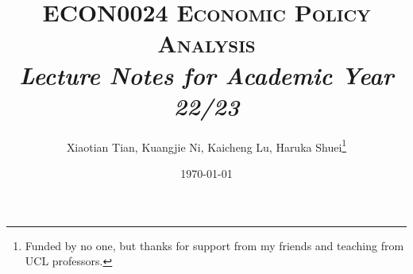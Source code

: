 \documentclass{report}
\title{\textsc{ECON0024 Economic Policy Analysis}\\
{\Large \textit{Lecture Notes for Academic Year 22/23}}}
\author{Xiaotian Tian, Kuangjie Ni, Kaicheng Lu, Haruka Shuei\thanks{Funded by no one, but thanks for support from my friends and teaching from UCL professors.}}
\date{\today}
\begin{document}
\begin{CJK*}{UTF8}{gbsn}%

\pagestyle{fancy}%

\maketitle

\newpage
    \hypertarget{tableofcontents}{\tableofcontents}
\newpage


%


\iftrue%
    
    
\fi

\iftrue
   
   
\fi

\iftrue
    \begin{refsection} %
        
        \printbibliography %
    \end{refsection}
    \begin{refsection}
        
        \printbibliography %
    \end{refsection}
\fi

\iftrue
    
    
\fi

\iftrue
    \begin{refsection} %
        
        \printbibliography %
    \end{refsection}
    \begin{refsection}
        
        \printbibliography %
    \end{refsection}
\fi

\iftrue
    \begin{refsection} %
        
        \printbibliography %
    \end{refsection}
    \begin{refsection}
        
        \printbibliography %
    \end{refsection}
\fi


\end{CJK*}
\end{document}
